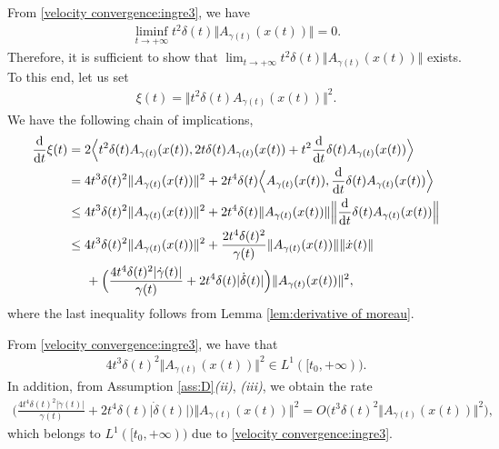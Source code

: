 \documentclass[11pt]{article}
\numberwithin{equation}{section}
\begin{document}
From \eqref{velocity convergence:ingre3}, we have 
\begin{align*}
    \liminf_{t \rightarrow+\infty} t^2\delta(t)\Big\Vert A_{\gamma(t)}(x(t)) \Big\Vert=0.
\end{align*}
Therefore, it is sufficient to show that $\lim_{t \rightarrow+\infty} t^2\delta(t)\Big\Vert A_{\gamma(t)}(x(t)) \Big\Vert$ exists. To this end, let us set
\begin{align*}
    \xi(t)=\Vert t^2\delta(t)A_{\gamma(t)}(x(t)) \Vert^2.
\end{align*}
We have the following chain of implications,
\begin{align*}
    \frac{\mathrm{d}}{\mathrm{d}t}\xi(t) 
    &=2\Big\langle t^2\delta(t)A_{\gamma(t)}(x(t)), 2t\delta(t)A_{\gamma(t)}(x(t))+t^2\frac{\mathrm{d}}{\mathrm{d}t}\delta(t)A_{\gamma(t)}(x(t)) \Big\rangle \\
    &=4t^3\delta(t)^2\Vert A_{\gamma(t)}(x(t)) \Vert^2+2t^4\delta(t)\Big\langle A_{\gamma(t)} (x(t)),\frac{\mathrm{d}}{\mathrm{d}t}\delta(t)A_{\gamma(t)}(x(t)) \Big\rangle\\
    &\le 4t^3\delta(t)^2\Vert A_{\gamma(t)}(x(t)) \Vert^2+2t^4\delta(t)\Vert A_{\gamma(t)} (x(t))\Vert \Big\Vert\frac{\mathrm{d}}{\mathrm{d}t}\delta(t)A_{\gamma(t)}(x(t)) \Big\Vert \\ 
    &\le  4t^3\delta(t)^2\Vert A_{\gamma(t)}(x(t)) \Vert^2+\frac{2t^4\delta(t)^2}{\gamma(t)}\Vert A_{\gamma(t)}(x(t)) \Vert \Vert \dot{x}(t) \Vert\\
    &\hspace{5mm} +\Big(\frac{4t^4\delta(t)^2\vert \dot{\gamma}(t)\vert}{\gamma(t)}+2t^4\delta(t)\vert \dot{\delta}(t)\vert\Big)\Vert A_{\gamma(t)}(x(t)) \Vert^2,
\end{align*}
where the last inequality follows from Lemma \ref{lem:derivative of moreau}. 

From \ref{velocity convergence:ingre3}, we have that
\begin{align*}
4t^3\delta(t)^2\Vert A_{\gamma(t)}(x(t)) \Vert^2 \in L^1([t_0,+\infty)).   
\end{align*}
In addition, from Assumption \ref{ass:D}\textit{(ii)}, \textit{(iii)}, we obtain the rate 
\begin{align*}
    \Big(\frac{4t^4\delta(t)^2\vert \dot{\gamma}(t)\vert}{\gamma(t)}+2t^4\delta(t)\vert \dot{\delta}(t)\vert\Big)\Vert A_{\gamma(t)}(x(t)) \Vert^2 = O\Big(t^3\delta(t)^2\Vert A_{\gamma(t)}(x(t)) \Vert^2\Big),
\end{align*}
which belongs to $L^1([t_0,+\infty))$ due to \eqref{velocity convergence:ingre3}.
\end{document}

